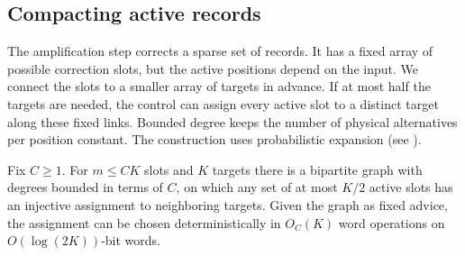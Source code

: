 \subsection{Compacting active records}

The amplification step corrects a sparse set of records. It has a
fixed array of possible correction slots, but the active positions depend
on the input. We connect the slots to a smaller array of targets in
advance. If at most half the targets are needed, the control can assign
every active slot to a distinct target along these fixed links. Bounded
degree keeps the number of physical alternatives per position constant.
The construction uses probabilistic expansion (see \cite{HLW}).

\begin{lemma}\label{lem:slack-compaction}
Fix $C\ge1$. For $m\le CK$ slots and $K$ targets there is a bipartite
graph with degrees bounded in terms of $C$, on which any set of at most
$K/2$ active slots has an injective assignment to neighboring targets.
Given the graph as fixed advice, the assignment can be chosen
deterministically in $O_C(K)$ word operations on $O(\log(2K))$-bit words.
\end{lemma}

